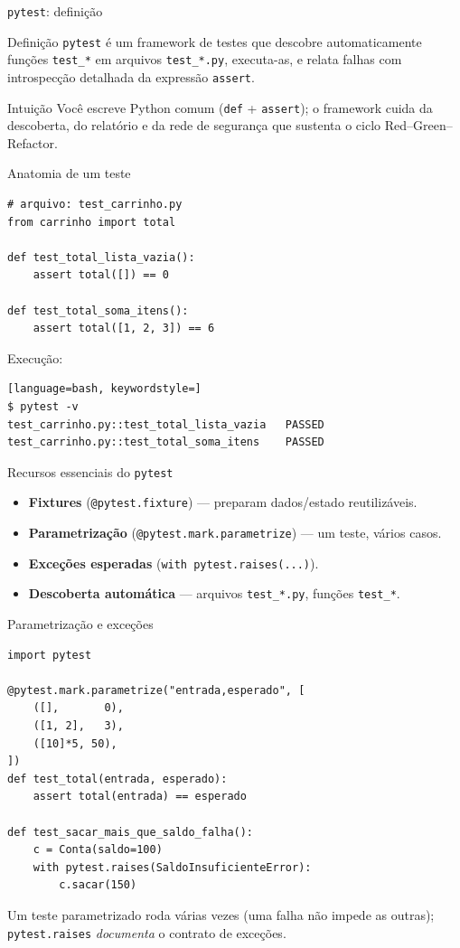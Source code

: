 \documentclass[aspectratio=169]{beamer}
\begin{document}
\begin{frame}{\texttt{pytest}: definição}
  \begin{block}{Definição}
    \texttt{pytest} é um framework de testes que descobre
    automaticamente funções \texttt{test\_*} em arquivos \texttt{test\_*.py},
    executa-as, e relata falhas com introspecção detalhada da expressão \texttt{assert}.
  \end{block}
  \begin{exampleblock}{Intuição}
    Você escreve Python comum (\texttt{def} + \texttt{assert});
    o framework cuida da descoberta, do relatório e da
    rede de segurança que sustenta o ciclo Red--Green--Refactor.
  \end{exampleblock}
\end{frame}

\begin{frame}[fragile]{Anatomia de um teste}
\begin{lstlisting}
# arquivo: test_carrinho.py
from carrinho import total

def test_total_lista_vazia():
    assert total([]) == 0

def test_total_soma_itens():
    assert total([1, 2, 3]) == 6
\end{lstlisting}
Execução:
\begin{lstlisting}[language=bash, keywordstyle=]
$ pytest -v
test_carrinho.py::test_total_lista_vazia   PASSED
test_carrinho.py::test_total_soma_itens    PASSED
\end{lstlisting}
\end{frame}

\begin{frame}{Recursos essenciais do \texttt{pytest}}
  \begin{itemize}
    \item \textbf{Fixtures} (\texttt{@pytest.fixture}) --- preparam dados/estado reutilizáveis.
    \item \textbf{Parametrização} (\texttt{@pytest.mark.parametrize}) --- um teste, vários casos.
    \item \textbf{Exceções esperadas} (\texttt{with pytest.raises(...)}).
    \item \textbf{Descoberta automática} --- arquivos \texttt{test\_*.py}, funções \texttt{test\_*}.
  \end{itemize}
\end{frame}

\begin{frame}[fragile]{Parametrização e exceções}
\begin{lstlisting}
import pytest

@pytest.mark.parametrize("entrada,esperado", [
    ([],       0),
    ([1, 2],   3),
    ([10]*5, 50),
])
def test_total(entrada, esperado):
    assert total(entrada) == esperado

def test_sacar_mais_que_saldo_falha():
    c = Conta(saldo=100)
    with pytest.raises(SaldoInsuficienteError):
        c.sacar(150)
\end{lstlisting}
\small Um teste parametrizado roda várias vezes (uma falha não impede as outras);
\texttt{pytest.raises} \emph{documenta} o contrato de exceções.
\end{frame}
\end{document}
